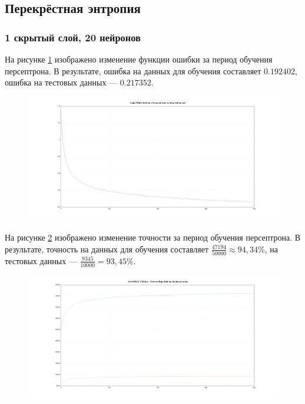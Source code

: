 \documentclass[a4paper, 14pt]{extarticle}
\begin{document}
\subsection{Перекрёстная энтропия}

\subsubsection{1 скрытый слой, 20 нейронов}


На рисунке \ref{fig:1_20_leaky_relu_softmax_cross_entropy_cost} изображено изменение функции ошибки за период обучения персептрона.
В результате, ошибка на данных для обучения составляет $0.192402$, ошибка на тестовых данных --- $0.217352$.

\begin{figure}[!htb]
  \centering\includegraphics[width=\textwidth]{images/1_20_leaky_relu_softmax_cross_entropy_cost.png}
  \caption{}
  \label{fig:1_20_leaky_relu_softmax_cross_entropy_cost}
\end{figure}

На рисунке \ref{fig:1_20_leaky_relu_softmax_cross_entropy_accuracy} изображено изменение точности за период обучения персептрона.
В результате, точность на данных для обучения составляет $\frac{47194}{50000} \approx 94,34\%$, на тестовых данных --- $\frac{9345}{10000} = 93,45\%$.

\begin{figure}[!htb]
  \centering\includegraphics[width=\textwidth]{images/1_20_leaky_relu_softmax_cross_entropy_accuracy.png}
  \caption{}
  \label{fig:1_20_leaky_relu_softmax_cross_entropy_accuracy}
\end{figure}
\end{document}
